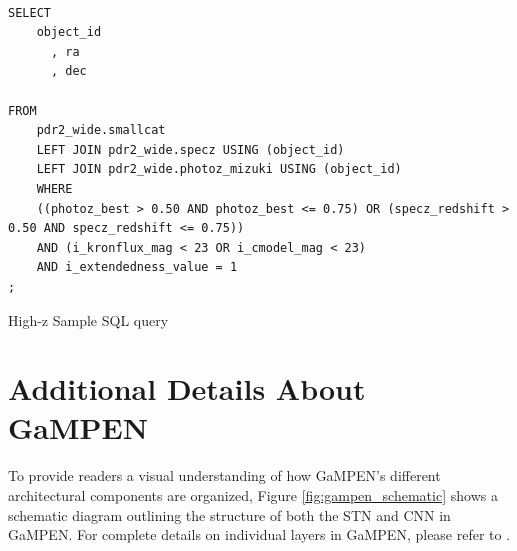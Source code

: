 \documentclass[linenumbers,twocolumn,twocolappendix]{aastex631}
\newcommand\gampen{GaMPEN}
\begin{document}
\begin{CJK*}{UTF8}{gbsn}
\begin{listing}[H]
\begin{verbatim}

SELECT
    object_id
      , ra
      , dec
      
FROM
    pdr2_wide.smallcat
    LEFT JOIN pdr2_wide.specz USING (object_id)
    LEFT JOIN pdr2_wide.photoz_mizuki USING (object_id)
    WHERE
    ((photoz_best > 0.50 AND photoz_best <= 0.75) OR (specz_redshift > 0.50 AND specz_redshift <= 0.75))
    AND (i_kronflux_mag < 23 OR i_cmodel_mag < 23)
    AND i_extendedness_value = 1
;
\end{verbatim}
\caption{High-z Sample SQL query}
\label{code:sql_high_z}
\end{listing}


\section{Additional Details About \gampen{}}\label{ap:gampen}

To provide readers a visual understanding of how \gampen{}'s different architectural components are organized, Figure \ref{fig:gampen_schematic} shows a schematic diagram outlining the structure of both the STN and CNN in \gampen{}. For complete details on individual layers in \gampen{}, please refer to \citet{gampen_software_paper}.


\end{CJK*}
\end{document}
